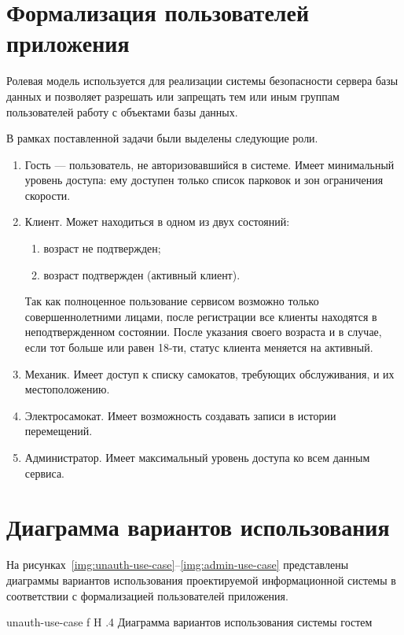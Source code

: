 \section{Формализация пользователей приложения}

Ролевая модель используется для реализации системы безопасности сервера базы данных и позволяет разрешать или запрещать тем или иным группам пользователей работу с объектами базы данных.

В рамках поставленной задачи были выделены следующие роли.

\begin{enumerate}
	\item Гость --- пользователь, не авторизовавшийся в системе. Имеет минимальный уровень доступа: ему доступен только список парковок и зон ограничения скорости.
	\item Клиент. Может находиться в одном из двух состояний:
	      \begin{enumerate}
		      \item возраст не подтвержден;
		      \item возраст подтвержден (активный клиент).
	      \end{enumerate}
	      Так как полноценное пользование сервисом возможно только совершеннолетними лицами, после регистрации все клиенты находятся в неподтвержденном состоянии. После указания своего возраста и в случае, если тот больше или равен 18-ти, статус клиента меняется на активный.
	\item Механик. Имеет доступ к списку самокатов, требующих обслуживания, и их местоположению.
	\item Электросамокат. Имеет возможность создавать записи в истории перемещений.
	\item Администратор. Имеет максимальный уровень доступа ко всем данным сервиса.
\end{enumerate}

\pagebreak
\section{Диаграмма вариантов использования}

На рисунках~\ref{img:unauth-use-case}--\ref{img:admin-use-case} представлены диаграммы вариантов использования проектируемой информационной системы в соответствии с формализацией пользователей приложения.

{unauth-use-case}
{f}
{H}
{.4\textwidth}
{Диаграмма вариантов использования системы гостем}

